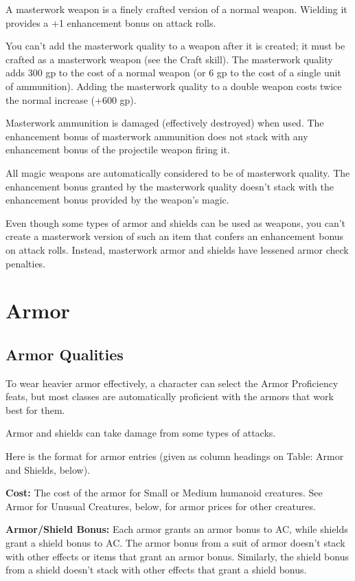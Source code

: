 A masterwork weapon is a finely crafted version of a normal weapon. Wielding it 
provides a +1 enhancement bonus on attack rolls.

You can't add the masterwork quality to a weapon after it is created; it must be 
crafted as a masterwork weapon (see the Craft skill). The masterwork quality adds 
300 gp to the cost of a normal weapon (or 6 gp to the cost of a single unit of 
ammunition). Adding the masterwork quality to a double weapon costs twice the normal 
increase (+600 gp).

Masterwork ammunition is damaged (effectively destroyed) when used. The enhancement 
bonus of masterwork ammunition does not stack with any enhancement bonus of the 
projectile weapon firing it.

All magic weapons are automatically considered to be of masterwork quality. The 
enhancement bonus granted by the masterwork quality doesn't stack with the enhancement 
bonus provided by the weapon's magic.

Even though some types of armor and shields can be used as weapons, you can't create 
a masterwork version of such an item that confers an enhancement bonus on attack 
rolls. Instead, masterwork armor and shields have lessened armor check penalties.

\section{Armor}

\subsection{Armor Qualities}

To wear heavier armor effectively, a character can select the Armor Proficiency 
feats, but most classes are automatically proficient with the armors that work 
best for them.

Armor and shields can take damage from some types of attacks. 

Here is the format for armor entries (given as column headings on Table: Armor 
and Shields, below).

\textbf{Cost:} The cost of the armor for Small or Medium humanoid creatures. See 
Armor for Unusual Creatures, below, for armor prices for other creatures.

\textbf{Armor/Shield Bonus:} Each armor grants an armor bonus to AC, while shields 
grant a shield bonus to AC. The armor bonus from a suit of armor doesn't stack 
with other effects or items that grant an armor bonus. Similarly, the shield bonus 
from a shield doesn't stack with other effects that grant a shield bonus.

